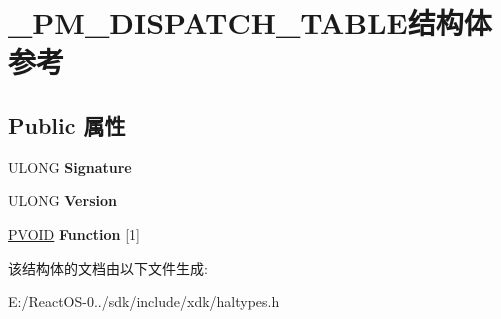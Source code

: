 \hypertarget{struct___p_m___d_i_s_p_a_t_c_h___t_a_b_l_e}{}\section{\+\_\+\+P\+M\+\_\+\+D\+I\+S\+P\+A\+T\+C\+H\+\_\+\+T\+A\+B\+L\+E结构体 参考}
\label{struct___p_m___d_i_s_p_a_t_c_h___t_a_b_l_e}
\subsection*{Public 属性}
\begin{DoxyCompactItemize}
\item 
\mbox{\label{struct___p_m___d_i_s_p_a_t_c_h___t_a_b_l_e_a34624ce37086f021d0eacf41ec80fe2c}} 
U\+L\+O\+NG {\bfseries Signature}
\item 
\mbox{\label{struct___p_m___d_i_s_p_a_t_c_h___t_a_b_l_e_a09228d6e65513153842b86f03d9a195a}} 
U\+L\+O\+NG {\bfseries Version}
\item 
\mbox{\label{struct___p_m___d_i_s_p_a_t_c_h___t_a_b_l_e_a8526d4fcb81e6b9fb038dde43d568364}} 
\hyperlink{interfacevoid}{P\+V\+O\+ID} {\bfseries Function} \mbox{[}1\mbox{]}
\end{DoxyCompactItemize}


该结构体的文档由以下文件生成\+:\begin{DoxyCompactItemize}
\item 
E\+:/\+React\+O\+S-\/0../sdk/include/xdk/haltypes.\+h\end{DoxyCompactItemize}
